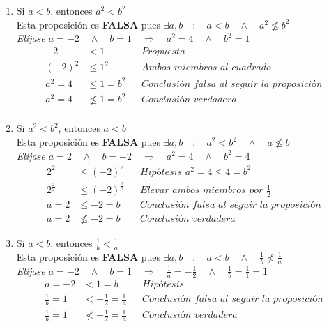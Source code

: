 \documentclass{article}
\begin{document}
\begin{enumerate}
  \item Si \(a<b\), entonces \(a^2<b^2\) \\
  Esta proposición es \textbf{FALSA} pues \( \exists a,b \quad : \quad a < b \quad \land \quad a^2 \nleq b^2 \) \\
  \textit{Elíjase \(a=-2 \quad \land \quad b=1 \quad \Rightarrow \quad a^2 = 4 \quad \land \quad b^2 = 1\)}
  \begin{align*}
      -2 &< 1 && \textit{Propuesta}\\
      (-2)^2 &\leq 1^2 &&\textit{Ambos miembros al cuadrado}\\
      a^2 = 4 &\leq 1 = b^2 && \textit{Conclusión falsa al seguir la proposición}\\
      a^2 = 4 &\nleq 1 = b^2 && \textit{Conclusión verdadera}\\
  \end{align*}


  
  \item Si \(a^2<b^2\), entonces \(a<b\)\\
  Esta proposición es \textbf{FALSA} pues \( \exists a,b \quad : \quad a^2 < b^2 \quad \land \quad a \nleq b \) \\
\textit{Elíjase \(a = 2 \quad \land \quad b = -2 \quad \Rightarrow \quad a^2 = 4 \quad \land \quad b^2 = 4\)}
\begin{align*}
    2^2 &\leq (-2)^2 && \textit{Hipótesis } a^2=4 \leq 4 = b^2 \\
    2^{\frac{2}{2}} &\leq (-2)^{\frac{2}{2}} && \textit{Elevar ambos miembros por }\frac{1}{2} \\
    a = 2 &\leq -2 = b && \textit{Conclusión falsa al seguir la proposición} \\
    a = 2 &\nleq -2 = b && \textit{Conclusión verdadera}
\end{align*}

\item Si \(a<b\), entonces \(\frac{1}{b}<\frac{1}{a}\)\\
Esta proposición es \textbf{FALSA} pues \( \exists a,b \quad : \quad a<b \quad \land \quad \frac{1}{b} \nless \frac{1}{a} \) \\
\textit{Elíjase \(a = -2 \quad \land \quad b = 1 \quad \Rightarrow \quad \frac{1}{a} = -\frac{1}{2} \quad \land \quad \frac{1}{b} = \frac{1}{1} = 1 \)}
\begin{align*}
    a = -2 &< 1 = b && \textit{Hipótesis}\\
    \frac{1}{b} = 1 &< -\frac{1}{2} = \frac{1}{a} && \textit{Conclusión falsa al seguir la proposición} \\
    \frac{1}{b} = 1 &\nless -\frac{1}{2} = \frac{1}{a} && \textit{Conclusión verdadera}
\end{align*}

  
\end{enumerate}
\end{document}
